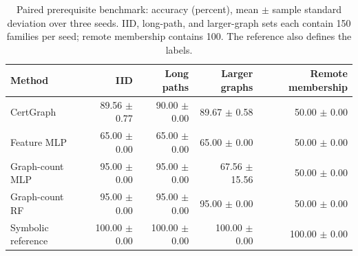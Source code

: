 \begin{table}[t]
\centering
\caption{Paired prerequisite benchmark: accuracy (percent), mean $\pm$ sample standard deviation over three seeds. IID, long-path, and larger-graph sets each contain 150 families per seed; remote membership contains 100. The reference also defines the labels.}
\label{tab:counterfactual}
\footnotesize
\begin{tabular}{lrrrr}
\toprule
Method & IID & Long paths & Larger graphs & Remote membership \\
\midrule
CertGraph & 89.56 $\pm$ 0.77 & 90.00 $\pm$ 0.00 & 89.67 $\pm$ 0.58 & 50.00 $\pm$ 0.00 \\
Feature MLP & 65.00 $\pm$ 0.00 & 65.00 $\pm$ 0.00 & 65.00 $\pm$ 0.00 & 50.00 $\pm$ 0.00 \\
Graph-count MLP & 95.00 $\pm$ 0.00 & 95.00 $\pm$ 0.00 & 67.56 $\pm$ 15.56 & 50.00 $\pm$ 0.00 \\
Graph-count RF & 95.00 $\pm$ 0.00 & 95.00 $\pm$ 0.00 & 95.00 $\pm$ 0.00 & 50.00 $\pm$ 0.00 \\
Symbolic reference & 100.00 $\pm$ 0.00 & 100.00 $\pm$ 0.00 & 100.00 $\pm$ 0.00 & 100.00 $\pm$ 0.00 \\
\bottomrule
\end{tabular}
\end{table}
